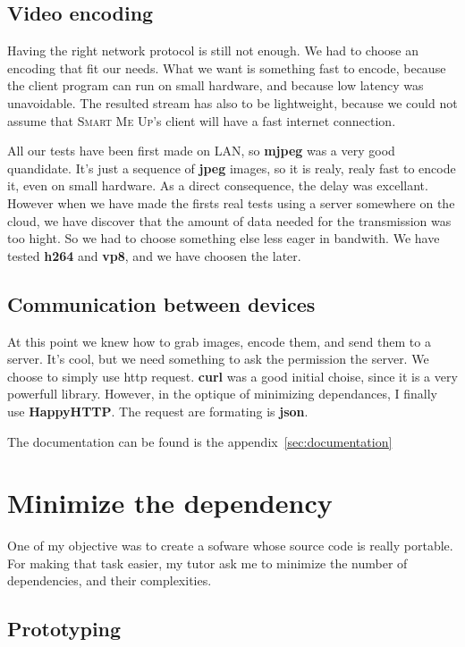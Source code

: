 \documentclass[a4paper,11pt]{custom}
\newcommand{\smu}{\textsc{Smart Me Up}}
\newcommand{\curl}{\textbf{curl}\xspace}
\newcommand{\happyhttp}{\textbf{HappyHTTP}\xspace}
\newcommand{\mjpeg}{\textbf{mjpeg}\xspace}
\newcommand{\jpeg}{\textbf{jpeg}\xspace}
\newcommand{\vpx}{\textbf{vp8}\xspace}
\newcommand{\mpeg}{\textbf{h264}\xspace}
\newcommand{\json}{\textbf{json}\xspace}
\begin{document}
\subsection{Video encoding}

Having the right network protocol is still not enough. We had to choose an
encoding that fit our needs. What we want is something fast to encode,
because the client program can run on small hardware, and because low latency
was unavoidable. The resulted stream has also to be lightweight, because we
could not assume that \smu's client will have a fast internet connection.

All our tests have been first made on LAN, so \mjpeg{} was a very good
quandidate. It's just a sequence of \jpeg{} images, so it is realy, realy fast
to encode it, even on small hardware. As a direct consequence, the delay was
excellant. However when we have made the firsts real tests using a server
somewhere on the cloud, we have discover that the amount of data needed for the
transmission was too hight. So we had to choose something else less eager in
bandwith. We have tested \mpeg{} and \vpx, and we have choosen the later.

\subsection{Communication between devices}
\label{sec:communication}

At this point we knew how to grab images, encode them, and send them to a
server. It's cool, but we need something to ask the permission the server. We
choose to simply use http request. \curl{} was a good initial choise, since it
is a very powerfull library. However, in the optique of minimizing dependances,
I finally use \happyhttp. The request are formating is \json.

The documentation can be found is the appendix~\ref{sec:documentation}

\section{Minimize the dependency}

One of my objective was to create a sofware whose source code is really
portable. For making that task easier, my tutor ask me to minimize the number of
dependencies, and their complexities.

\subsection{Prototyping}
\end{document}
